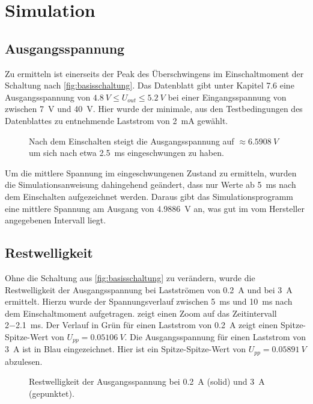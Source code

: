 \chapter{Simulation}
	\section{Ausgangsspannung}
		Zu ermitteln ist einerseits der Peak des Überschwingens im Einschaltmoment der Schaltung nach \cref{fig:basisschaltung}.
		Das Datenblatt gibt unter Kapitel 7.6 eine Ausgangsspannung von \(\SI{4,8}{V} \leq U_{out} \leq \SI{5,2}{V}\) bei einer Eingangsspannung von
		zwischen \SI{7}{V} und \SI{40}{V}. Hier wurde der minimale, aus den Testbedingungen des Datenblattes zu entnehmende Laststrom von \SI{2}{mA}
		gewählt.
		\begin{figure}[h]
			\centering
			
			\caption[Spannungsspitze nach dem Einschalten]{Nach dem Einschalten steigt die Ausgangsspannung auf \(\approx \SI{6,5908}{V}\)
			um sich nach etwa \SI{2,5}{ms} eingeschwungen zu haben.}
			\label{fig:einschaltpeak}
		\end{figure}
		Um die mittlere Spannung im eingeschwungenen Zustand zu ermitteln, wurden die Simulationsanweisung dahingehend geändert, dass
		nur Werte ab \SI{5}{ms} nach dem Einschalten aufgezeichnet werden. Daraus gibt das Simulationsprogramm eine mittlere
		Spannung am Ausgang von \SI{4,9886}{V} an, was gut im vom Hersteller angegebenen Intervall liegt.
	\newpage
	\section{Restwelligkeit}
		Ohne die Schaltung aus \cref{fig:basisschaltung} zu verändern, wurde die Restwelligkeit der Ausgangsspannung bei
		Lastströmen von \SI{0,2}{A} und bei \SI{3}{A} ermittelt. Hierzu wurde der Spannungsverlauf zwischen \SI{5}{ms} und \SI{10}{ms}
		nach dem Einschaltmoment aufgetragen.  zeigt einen Zoom auf das Zeitintervall \SI{2-2,1}{ms}.
		Der Verlauf in Grün für einen Laststrom von \SI{0,2}{A} zeigt einen Spitze-Spitze-Wert von \(U_{pp} = \SI{0,05106}{V}\).
		Die Ausgangsspannung für einen Laststrom von \SI{3}{A} ist in Blau eingezeichnet. Hier ist ein Spitze-Spitze-Wert von \(U_{pp} = \SI{0,05891}{V}\)
		abzulesen.
		\begin{figure}[h]
			\centering
			
			\caption[Restwelligkeit der Ausgangsspannung.]{Restwelligkeit der Ausgangsspannung bei \SI{0,2}{A} (solid) und \SI{3}{A} (gepunktet).}
			\label{fig:ripple}
		\end{figure}
